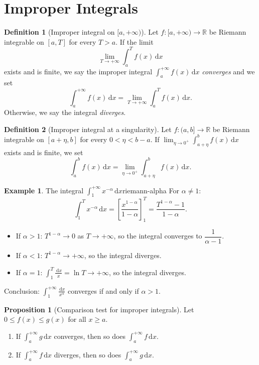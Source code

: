 \documentclass[12pt,a4paper]{book}
\theoremstyle{definition}
\newtheorem{definition}{Definition}[chapter]
\newtheorem{proposition}{Proposition}[chapter]
\newtheorem{example}{Example}[chapter]
\newcommand{\R}{\mathbb{R}}
\newcommand{\dd}{\,\mathrm{d}}
\begin{document}
\section{Improper Integrals}\label{sec:improper}

\begin{definition}[Improper integral on $[a,+\infty)$]\label{def:improper-inf}
  Let $f\colon[a,+\infty)\to\R$ be Riemann integrable on $[a,T]$ for
  every $T>a$.  If the limit
  \[
    \lim_{T\to+\infty}\int_a^T f(x)\dd x
  \]
  exists and is finite, we say the improper integral
  $\displaystyle\int_a^{+\infty}f(x)\dd x$ \emph{converges} and we set
  \[
    \int_a^{+\infty}f(x)\dd x = \lim_{T\to+\infty}\int_a^T f(x)\dd x.
  \]
  Otherwise, we say the integral \emph{diverges}.
\end{definition}

\begin{definition}[Improper integral at a singularity]\label{def:improper-sing}
  Let $f\colon(a,b]\to\R$ be Riemann integrable on $[a+\eta,b]$ for
  every $0<\eta<b-a$.  If $\displaystyle\lim_{\eta\to0^+}\int_{a+\eta}^b f(x)\dd x$
  exists and is finite, we set
  \[
    \int_a^b f(x)\dd x = \lim_{\eta\to0^+}\int_{a+\eta}^b f(x)\dd x.
  \]
\end{definition}

\begin{example}{The integral $\int_1^{+\infty}x^{-\alpha}\dd x$}{riemann-alpha}
  For $\alpha\ne1$:
  \[
    \int_1^T x^{-\alpha}\dd x
    = \left[\frac{x^{1-\alpha}}{1-\alpha}\right]_1^T
    = \frac{T^{1-\alpha}-1}{1-\alpha}.
  \]
  \begin{itemize}
    \item If $\alpha>1$: $T^{1-\alpha}\to0$ as $T\to+\infty$, so the
      integral converges to $\dfrac{1}{\alpha-1}$.
    \item If $\alpha<1$: $T^{1-\alpha}\to+\infty$, so the integral
      diverges.
    \item If $\alpha=1$: $\displaystyle\int_1^T\frac{\dd x}{x}=\ln T\to+\infty$,
      so the integral diverges.
  \end{itemize}
  Conclusion: $\displaystyle\int_1^{+\infty}\frac{\dd x}{x^\alpha}$
  converges if and only if $\alpha>1$.
\end{example}

\begin{proposition}[Comparison test for improper integrals]\label{prop:comparison-test}
  Let $0\le f(x)\le g(x)$ for all $x\ge a$.
  \begin{enumerate}[label=(\alph*)]
    \item If $\int_a^{+\infty}g\dd x$ converges, then so does
      $\int_a^{+\infty}f\dd x$.
    \item If $\int_a^{+\infty}f\dd x$ diverges, then so does
      $\int_a^{+\infty}g\dd x$.
  \end{enumerate}
\end{proposition}
\end{document}

